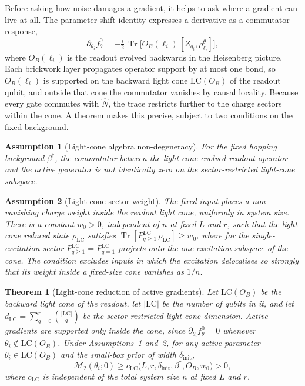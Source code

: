 \documentclass{article}
\newtheorem{theorem}{Theorem}
\newtheorem{assumption}{Assumption}
\newcommand{\Mtwo}{\mathcal{M}_2}
\newcommand{\LC}{\mathrm{LC}}
\newcommand{\Tr}{\operatorname{Tr}}
\begin{document}
Before asking how noise damages a gradient, it helps to ask where a gradient can live at all. The parameter-shift identity expresses a derivative as a commutator response,
\begin{equation}
    \partial_{\theta_i}f^0_\theta
    =
    -\tfrac{i}{2}\,\Tr\!\bigl[O_B(\ell_i)\,[Z_{q_i},\rho^\theta_{\ell_i}]\bigr],
    \label{eq:psr}
\end{equation}
where $O_B(\ell_i)$ is the readout evolved backwards in the Heisenberg picture. Each brickwork layer propagates operator support by at most one bond, so $O_B(\ell_i)$ is supported on the backward light cone $\LC(O_B)$ of the readout qubit, and outside that cone the commutator vanishes by causal locality. Because every gate commutes with $\hat N$, the trace restricts further to the charge sectors within the cone. A theorem makes this precise, subject to two conditions on the fixed background.

\begin{assumption}[Light-cone algebra non-degeneracy]\label{ass:nondegen}
For the fixed hopping background $\beta^\dagger$, the commutator between the light-cone-evolved readout operator and the active generator is not identically zero on the sector-restricted light-cone subspace.
\end{assumption}

\begin{assumption}[Light-cone sector weight]\label{ass:weight}
The fixed input places a non-vanishing charge weight inside the readout light cone, uniformly in system size. There is a constant $w_0>0$, independent of $n$ at fixed $L$ and $r$, such that the light-cone reduced state $\rho_{\LC}$ satisfies $\Tr[P^{\LC}_{q\geq1}\,\rho_{\LC}]\geq w_0$, where for the single-excitation sector $P^{\LC}_{q\geq1}=P^{\LC}_{q=1}$ projects onto the one-excitation subspace of the cone. The condition excludes inputs in which the excitation delocalises so strongly that its weight inside a fixed-size cone vanishes as $1/n$.
\end{assumption}

\begin{theorem}[Light-cone reduction of active gradients]\label{thm:locality}
Let $\LC(O_B)$ be the backward light cone of the readout, let $|\LC|$ be the number of qubits in it, and let $d_{\LC}=\sum_{q=0}^{r}\binom{|\LC|}{q}$ be the sector-restricted light-cone dimension. Active gradients are supported only inside the cone, since $\partial_{\theta_i}f^0_\theta=0$ whenever $\theta_i\notin\LC(O_B)$. Under Assumptions~\ref{ass:nondegen} and~\ref{ass:weight}, for any active parameter $\theta_i\in\LC(O_B)$ and the small-box prior of width $\delta_{\mathrm{init}}$,
\begin{equation}
    \Mtwo(\theta_i;0)
    \geq
    c_{\LC}\bigl(L,r,\delta_{\mathrm{init}},\beta^\dagger,O_B,w_0\bigr)
    >0 ,
    \label{eq:lcbound}
\end{equation}
where $c_{\LC}$ is independent of the total system size $n$ at fixed $L$ and $r$.
\end{theorem}
\end{document}
